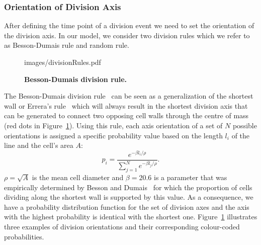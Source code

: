\documentclass[11pt,a4paper, final]{article}
\newenvironment{Itemize}{
 \begin{itemize}[leftmargin=0.5cm]{
}}{\end{itemize}}
\begin{document}
\subsubsection{Orientation of Division Axis}
\label{sec:divisionRules}
\noindent
After defining the time point of a division event we need to set the orientation of the division axis. In our model, we consider two division rules which we refer to as Besson-Dumais rule and random rule.
%
\begin{figure}[htbp]
	\begin{center}
		\begin{overpic}[width=0.6\linewidth]{images/divisionRules.pdf}
		\end{overpic}
\caption[]
{
{\bf  Besson-Dumais division rule.}
}
	\label{fig:divisionRules}
	\end{center}
\end{figure}
%

The Besson-Dumais division rule~\cite{besson_and_dumais_2011} can be seen as a generalization of the shortest wall or Errera's rule~\cite{errera_1886} which will always result in the shortest division axis that can be generated to connect two opposing cell walls through the centre of mass (red dots in Figure~\ref{fig:divisionRules}). Using this rule, each axis orientation of a set of $N$ possible orientations is assigned a specific probability value based on the length $l_i$ of the line and the cell's area $A$:
\begin{equation}
p_i = \frac{e^{-\beta l_i / \rho}}{\sum_{j=1}^{N} e^{-\beta l_j / \rho}}.
\end{equation}
$\rho = \sqrt{A}$ is the mean cell diameter and $\beta = 20.6$ is a parameter that was empirically determined by Besson and Dumais~\cite{besson_and_dumais_2011} for which the proportion of cells dividing along the shortest wall is supported by this value. As a consequence, we have a probability distribution function for the set of division axes and the axis with the highest probability is identical with the shortest one. Figure~\ref{fig:divisionRules} illustrates three examples of division orientations and their corresponding colour-coded probabilities.
\end{document}
